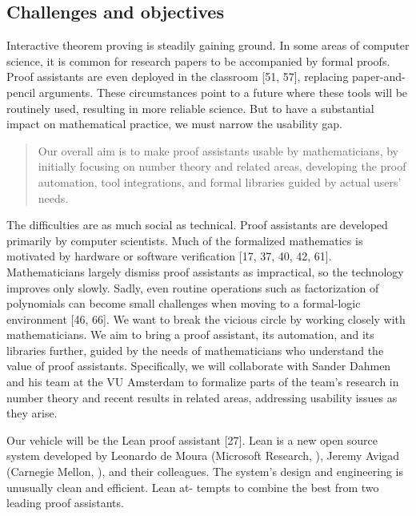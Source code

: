 \documentclass[12pt]{amsart}  %
\begin{document}






\subsection{Challenges and objectives}
Interactive theorem proving is steadily gaining ground. In some areas
of computer science, it is common for research papers to be accompanied by formal proofs. Proof
assistants are even deployed in the classroom [51, 57], replacing paper-and-pencil arguments.
These circumstances point to a future where these tools will be routinely used, resulting in
more reliable science.
But to have a substantial impact on mathematical practice, we must narrow the usability gap.

\begin{quote}
Our overall aim is to make proof assistants usable by mathematicians, by initially
focusing on number theory and related areas, developing the proof automation,
tool integrations, and formal libraries guided by actual users' needs.
\end{quote}

The difficulties are as much social as technical. Proof assistants are developed primarily by
computer scientists. Much of the formalized mathematics is motivated by hardware or software
verification [17, 37, 40, 42, 61]. Mathematicians largely dismiss proof assistants as impractical,
so the technology improves only slowly. Sadly, even routine operations such as factorization of
polynomials can become small challenges when moving to a formal-logic environment [46, 66].
We want to break the vicious circle by working closely with mathematicians. We aim to bring a
proof assistant, its automation, and its libraries further, guided by the needs of mathematicians
who understand the value of proof assistants. Specifically, we will collaborate with Sander Dahmen
and his team at the VU Amsterdam to formalize parts of the team's research in number theory and
recent results in related areas, addressing usability issues as they arise.

Our vehicle will be the Lean proof assistant [27]. Lean is a new open source system developed
by Leonardo de Moura (Microsoft Research, \usa), Jeremy Avigad (Carnegie Mellon, \usa), and
their colleagues. The system's design and engineering is unusually clean and efficient. Lean at-
tempts to combine the best from two leading proof assistants.
\end{document}
